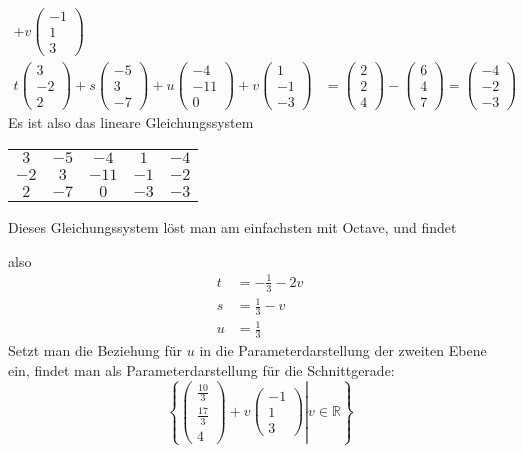 \begin{loesung}
\begin{align*}
+v
\begin{pmatrix}-1\\1\\3\end{pmatrix}
\\
t
\begin{pmatrix}3\\-2\\2\end{pmatrix}
+s
\begin{pmatrix}-5\\3\\-7\end{pmatrix}
+u
\begin{pmatrix}-4\\-11\\0\end{pmatrix}
+v
\begin{pmatrix}1\\-1\\-3\end{pmatrix}
&=
\begin{pmatrix}2\\2\\4\end{pmatrix}
-
\begin{pmatrix}6\\4\\7\end{pmatrix}
=
\begin{pmatrix}-4\\-2\\-3\end{pmatrix}
\end{align*}
Es ist also das lineare Gleichungssystem
\begin{center}
\begin{tabular}{|cccc|c|}
\hline
$ 3$&$-5$&$ -4$&$ 1$&$-4$\\
$-2$&$ 3$&$-11$&$-1$&$-2$\\
$ 2$&$-7$&$  0$&$-3$&$-3$\\
\hline
\end{tabular}
\end{center}
Dieses Gleichungssystem löst man am einfachsten mit Octave, und findet

also
\begin{align*}
t&=-\frac13-2v\\
s&=\frac13-v\\
u&=\frac13
\end{align*}
Setzt man die Beziehung für $u$ in die Parameterdarstellung der
zweiten Ebene  ein, findet man als Parameterdarstellung für die
Schnittgerade:
\[
\left\{\left.
\begin{pmatrix}\frac{10}{3}\\\frac{17}{3}\\4\end{pmatrix}
+v
\begin{pmatrix}-1\\1\\3\end{pmatrix}
\right|
v\in\mathbb R
\right\}
\]


\end{loesung}
